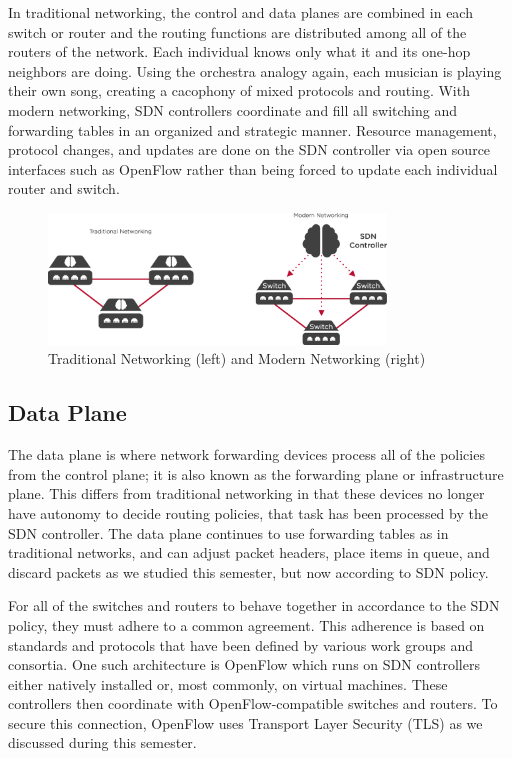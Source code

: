 \documentclass[11pt]{article}
\begin{document}
In traditional networking, the control and data planes are combined in each switch or router and the routing functions are distributed among all of the routers of the network. Each individual knows only what it and its one-hop neighbors are doing. Using the orchestra analogy again, each musician is playing their own song, creating a cacophony of mixed protocols and routing. With modern networking, SDN controllers coordinate and fill all switching and forwarding tables in an organized and strategic manner. Resource management, protocol changes, and updates are done on the SDN controller via open source interfaces such as OpenFlow rather than being forced to update each individual router and switch.

\begin{figure}
	\centering
	\includegraphics[width=0.8\textwidth]{SDNController}
	\caption[]{Traditional Networking (left) and Modern Networking (right)}
\end{figure}

\subsection{Data Plane}

The data plane is where network forwarding devices process all of the policies from the control plane; it is also known as the forwarding plane or infrastructure plane. This differs from traditional networking in that these devices no longer have autonomy to decide routing policies, that task has been processed by the SDN controller. The data plane continues to use forwarding tables as in traditional networks, and can adjust packet headers, place items in queue, and discard packets as we studied this semester, but now according to SDN policy.

For all of the switches and routers to behave together in accordance to the SDN policy, they must adhere to a common agreement. This adherence is based on standards and protocols that have been defined by various work groups and consortia. One such architecture is OpenFlow which runs on SDN controllers either natively installed or, most commonly, on virtual machines. These controllers then coordinate with OpenFlow-compatible switches and routers. To secure this connection, OpenFlow uses Transport Layer Security (TLS) as we discussed during this semester.
\end{document}

